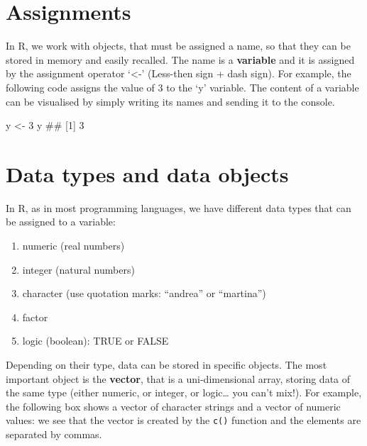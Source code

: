 \documentclass[a4paper,12pt,oneside]{book}
\providecommand{\tightlist}{%
  \setlength{\itemsep}{0pt}\setlength{\parskip}{0pt}}
\newenvironment{Shaded}{\begin{snugshade}}{\end{snugshade}}
\newcommand{\DecValTok}[1]{#1}
\newcommand{\DocumentationTok}[1]{#1}
\newcommand{\OtherTok}[1]{#1}
\newcommand{\NormalTok}[1]{#1}
\begin{document}
\hypertarget{assignments}{%
\section{Assignments}\label{assignments}}

In R, we work with objects, that must be assigned a name, so that they can be stored in memory and easily recalled. The name is a \textbf{variable} and it is assigned by the assignment operator `\textless-' (Less-then sign + dash sign). For example, the following code assigns the value of 3 to the `y' variable. The content of a variable can be visualised by simply writing its names and sending it to the console.

\begin{Shaded}
\begin{Highlighting}[]
\NormalTok{y  }\OtherTok{\textless{}{-}}  \DecValTok{3}
\NormalTok{y}
\DocumentationTok{\#\# [1] 3}
\end{Highlighting}
\end{Shaded}

\hypertarget{data-types-and-data-objects}{%
\section{Data types and data objects}\label{data-types-and-data-objects}}

In R, as in most programming languages, we have different data types that can be assigned to a variable:

\begin{enumerate}
\def\labelenumi{\arabic{enumi}.}
\tightlist
\item
  numeric (real numbers)
\item
  integer (natural numbers)
\item
  character (use quotation marks: ``andrea'' or ``martina'')
\item
  factor
\item
  logic (boolean): TRUE or FALSE
\end{enumerate}

Depending on their type, data can be stored in specific objects. The most important object is the \textbf{vector}, that is a uni-dimensional array, storing data of the same type (either numeric, or integer, or logic\ldots{} you can't mix!). For example, the following box shows a vector of character strings and a vector of numeric values: we see that the vector is created by the \texttt{c()} function and the elements are separated by commas.
\end{document}
